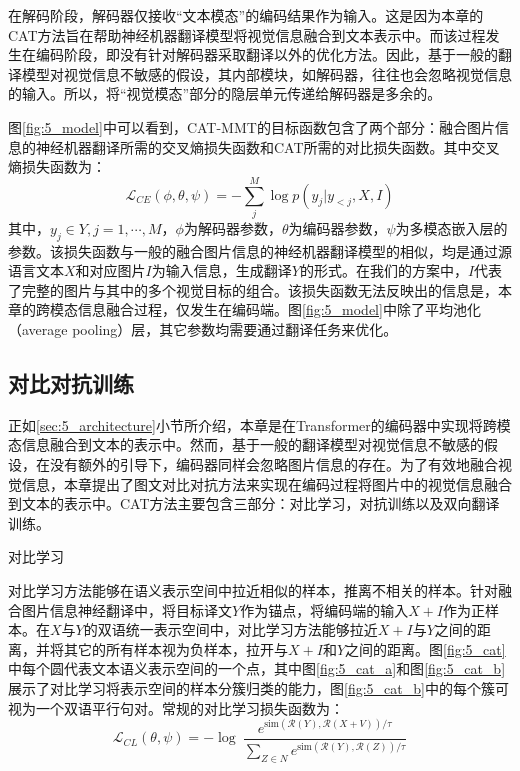 在解码阶段，解码器仅接收“文本模态”的编码结果作为输入。这是因为本章的CAT方法旨在帮助神经机器翻译模型将视觉信息融合到文本表示中。而该过程发生在编码阶段，即没有针对解码器采取翻译以外的优化方法。因此，基于一般的翻译模型对视觉信息不敏感的假设，其内部模块，如解码器，往往也会忽略视觉信息的输入。所以，将“视觉模态”部分的隐层单元传递给解码器是多余的。

图\ref{fig:5_model}中可以看到，CAT-MMT的目标函数包含了两个部分：融合图片信息的神经机器翻译所需的交叉熵损失函数和CAT所需的对比损失函数。其中交叉熵损失函数为：
\begin{equation}
    \mathcal{L}_{CE}(\phi, \theta, \psi)=-\sum_j^M \log p(y_j|y_{<j},X,I)
\label{eq:5_cross_entropy}
\end{equation}
其中，$y_j \in Y,j=1,\cdots,M$，$\phi$为解码器参数，$\theta$为编码器参数，$\psi$为多模态嵌入层的参数。该损失函数与一般的融合图片信息的神经机器翻译模型的相似，均是通过源语言文本$X$和对应图片$I$为输入信息，生成翻译$Y$的形式。在我们的方案中，$I$代表了完整的图片与其中的多个视觉目标的组合。该损失函数无法反映出的信息是，本章的跨模态信息融合过程，仅发生在编码端。图\ref{fig:5_model}中除了平均池化（average pooling）层，其它参数均需要通过翻译任务来优化。

\subsection{对比对抗训练}
\label{sec:5_cat}
正如\ref{sec:5_architecture}小节所介绍，本章是在Transformer的编码器中实现将跨模态信息融合到文本的表示中。然而，基于一般的翻译模型对视觉信息不敏感的假设，在没有额外的引导下，编码器同样会忽略图片信息的存在。为了有效地融合视觉信息，本章提出了图文对比对抗方法来实现在编码过程将图片中的视觉信息融合到文本的表示中。CAT方法主要包含三部分：对比学习，对抗训练以及双向翻译训练。


{\sffamily 对比学习}

对比学习方法能够在语义表示空间中拉近相似的样本，推离不相关的样本。针对融合图片信息神经翻译中，将目标译文$Y$作为锚点，将编码端的输入$X+I$作为正样本。在$X$与$Y$的双语统一表示空间中，对比学习方法能够拉近$X+I$与$Y$之间的距离，并将其它的所有样本视为负样本，拉开与$X+I$和$Y$之间的距离。图\ref{fig:5_cat}中每个圆代表文本语义表示空间的一个点，其中图\ref{fig:5_cat_a}和图\ref{fig:5_cat_b}展示了对比学习将表示空间的样本分簇归类的能力，图\ref{fig:5_cat_b}中的每个簇可视为一个双语平行句对。常规的对比学习损失函数为：
\begin{equation}
    \mathcal{L}_{CL}(\theta, \psi)=-\log\ \frac{e^{\mathrm{sim}(\mathcal{R}(Y),\mathcal{R}(X+V))/\tau}}{\sum_{Z\in N}e^{\mathrm{sim}(\mathcal{R}(Y),\mathcal{R}(Z))/\tau}}
    \label{eq:5_contrastive_learning}
\end{equation}

